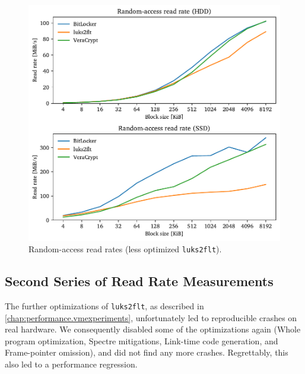 \begin{figure}[htb!]
	\center
	\includegraphics[scale=1]{../fig/performance.hwexperiments.beforeoptrand.pdf}
	\caption[
		Random-access read rates (less optimized \texttt{luks2flt})
	]{
		Random-access read rates (less optimized \texttt{luks2flt}). 
	}
	\label{fig:performance.hwexperiments.beforeoptrand}
\end{figure}

\subsection{Second Series of Read Rate Measurements}
\label{chap:performance.hwexperiments.encryptedseries2}
The further optimizations of \texttt{luks2flt}, as described in \autoref{chap:performance.vmexperiments}, unfortunately led to reproducible crashes on real hardware.  We consequently disabled some of the optimizations again (Whole program optimization, Spectre mitigations, Link-time code generation, and Frame-pointer omission), and did not find any more crashes. Regrettably, this also led to a performance regression. 


